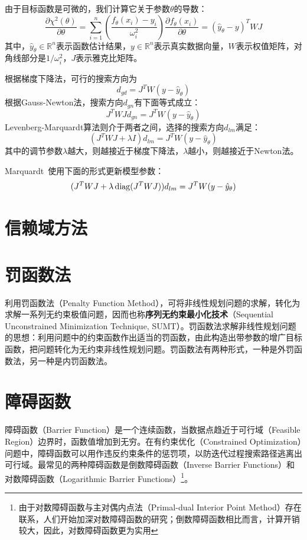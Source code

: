 由于目标函数是可微的，我们计算它关于参数$\theta$的导数：
\begin{equation}
    \frac{\partial \chi^2(\theta)}{\partial \theta} = \sum\limits_{i=1}^n (\frac{f_{\theta}(x_i) - y_i}{\omega_i^2}) \frac{\partial f_{\theta}(x_i)}{\partial \theta} = (\hat{y}_{\theta} - y)^T W J
\end{equation}
其中，$\hat{y}_{\theta}\in \mathbb{R}^n$表示函数估计结果，$y\in \mathbb{R}^n$表示真实数据向量，$W$表示权值矩阵，对角线部分是$1/\omega_i^2$，$J$表示雅克比矩阵。

根据梯度下降法，可行的搜索方向为
\begin{equation}
    d_{gd} = J^T W (y-\hat{y}_{\theta})
\end{equation}
根据Gauss-Newton法，搜索方向$d_{gn}$有下面等式成立：
\begin{equation}
    J^T W J d_{gn} = J^T W(y-\hat{y}_{\theta})
\end{equation}
Levenberg-Marquardt算法则介于两者之间，选择的搜索方向$d_{lm}$满足：
\begin{equation}
    (J^T W J + \lambda I) d_{lm} = J^T W(y-\hat{y}_{\theta})
\end{equation}
其中的调节参数$\lambda$越大，则越接近于梯度下降法，$\lambda$越小，则越接近于Newton法。

Marquardt~\cite{marquardt1963algorithm}使用下面的形式更新模型参数：
\begin{equation}
    (J^T W J + \lambda \operatorname{\mathrm{diag}}(J^T W J)) d_{lm} = J^T W(y-\hat{y}_{\theta})
\end{equation}

\section{信赖域方法}%

\section{罚函数法}
利用罚函数法（Penalty Function Method），可将非线性规划问题的求解，转化为求解一系列无约束极值问题，因而也称\textbf{序列无约束最小化技术}（Sequential Unconstrained Minimization Technique, SUMT）。罚函数法求解非线性规划问题的思想：利用问题中的约束函数作出适当的罚函数，由此构造出带参数的增广目标函数，把问题转化为无约束非线性规划问题。罚函数法有两种形式，一种是外罚函数法，另一种是内罚函数法。

\section{障碍函数}
障碍函数（Barrier Function）是一个连续函数，当数据点趋近于可行域（Feasible Region）边界时，函数值增加到无穷。在有约束优化（Constrained Optimization）问题中，障碍函数可以用作违反约束条件的惩罚项，以防迭代过程搜索路径逃离出可行域。最常见的两种障碍函数是倒数障碍函数（Inverse Barrier Functions）和对数障碍函数（Logarithmic Barrier Functions）\footnote{由于对数障碍函数与主对偶内点法（Primal-dual Interior Point Method）存在联系，人们开始加深对数障碍函数的研究；倒数障碍函数相比而言，计算开销较大，因此，对数障碍函数更为实用}。

